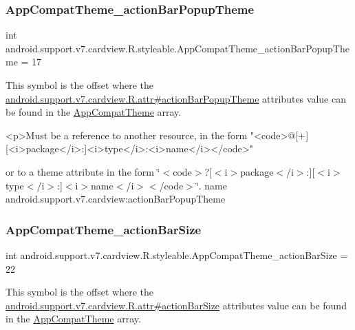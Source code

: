 \subsubsection{\texorpdfstring{App\+Compat\+Theme\+\_\+action\+Bar\+Popup\+Theme}{AppCompatTheme\_actionBarPopupTheme}}
{\footnotesize\ttfamily int android.\+support.\+v7.\+cardview.\+R.\+styleable.\+App\+Compat\+Theme\+\_\+action\+Bar\+Popup\+Theme = 17\hspace{0.3cm}{\ttfamily [static]}}

This symbol is the offset where the \hyperlink{classandroid_1_1support_1_1v7_1_1cardview_1_1R_1_1attr_a70ff332804ed3c7f1cc950f6cf913588}{android.\+support.\+v7.\+cardview.\+R.\+attr\#action\+Bar\+Popup\+Theme} attribute\textquotesingle{}s value can be found in the \hyperlink{classandroid_1_1support_1_1v7_1_1cardview_1_1R_1_1styleable_a52e6f69f954ecc2622d72c0b4d298938}{App\+Compat\+Theme} array.

\begin{DoxyVerb}      <p>Must be a reference to another resource, in the form "<code>@[+][<i>package</i>:]<i>type</i>:<i>name</i></code>"
\end{DoxyVerb}
 or to a theme attribute in the form \char`\"{}$<$code$>$?\mbox{[}$<$i$>$package$<$/i$>$\+:\mbox{]}\mbox{[}$<$i$>$type$<$/i$>$\+:\mbox{]}$<$i$>$name$<$/i$>$$<$/code$>$\char`\"{}.  name android.\+support.\+v7.\+cardview\+:action\+Bar\+Popup\+Theme \mbox{\label{classandroid_1_1support_1_1v7_1_1cardview_1_1R_1_1styleable_af90bee6c34b66aba2ac6c560cab1a628}} 
\subsubsection{\texorpdfstring{App\+Compat\+Theme\+\_\+action\+Bar\+Size}{AppCompatTheme\_actionBarSize}}
{\footnotesize\ttfamily int android.\+support.\+v7.\+cardview.\+R.\+styleable.\+App\+Compat\+Theme\+\_\+action\+Bar\+Size = 22\hspace{0.3cm}{\ttfamily [static]}}

This symbol is the offset where the \hyperlink{classandroid_1_1support_1_1v7_1_1cardview_1_1R_1_1attr_ac3e9990e1d340ee3e2e2fa35174e2f4b}{android.\+support.\+v7.\+cardview.\+R.\+attr\#action\+Bar\+Size} attribute\textquotesingle{}s value can be found in the \hyperlink{classandroid_1_1support_1_1v7_1_1cardview_1_1R_1_1styleable_a52e6f69f954ecc2622d72c0b4d298938}{App\+Compat\+Theme} array.


